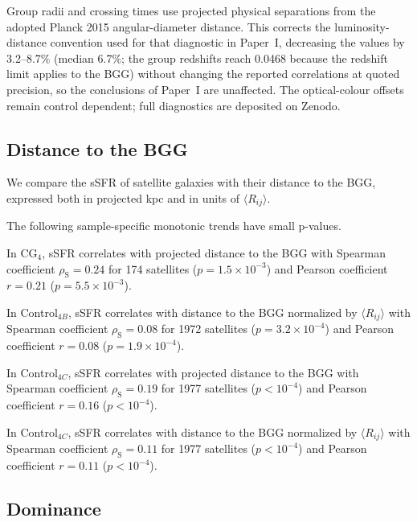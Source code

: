 \documentclass{aa}
\begin{document}
\begin{appendix}
Group radii and crossing times use projected physical separations from the adopted Planck 2015 angular-diameter distance. This corrects the luminosity-distance convention used for that diagnostic in Paper~I, decreasing the values by 3.2--8.7\% (median 6.7\%; the group redshifts reach 0.0468 because the redshift limit applies to the BGG) without changing the reported correlations at quoted precision, so the conclusions of Paper~I are unaffected. The optical-colour offsets remain control dependent; full diagnostics are deposited on Zenodo.

\iffalse
\subsection{Distance to the BGG}\label{app:dist2bgg}
We compare the sSFR of satellite galaxies with their distance to the BGG, expressed both in projected kpc and in units of $\langle R_{ij}\rangle$.

The following sample-specific monotonic trends have small p-values.

In CG$_4$, sSFR correlates with projected distance to the BGG with Spearman coefficient
$\rho_\mathrm{S} = 0.24$ for 174 satellites (\(p = 1.5\times 10^{-3}\)) and Pearson coefficient
$r = 0.21$ (\(p = 5.5\times 10^{-3}\)).

In Control$_{4B}$, sSFR correlates with distance to the BGG normalized by $\langle R_{ij}\rangle$ with Spearman coefficient
$\rho_\mathrm{S} = 0.08$ for 1972 satellites (\(p = 3.2\times 10^{-4}\)) and Pearson coefficient
$r = 0.08$ (\(p = 1.9\times 10^{-4}\)).

In Control$_{4C}$, sSFR correlates with projected distance to the BGG with Spearman coefficient
$\rho_\mathrm{S} = 0.19$ for 1977 satellites (\(p<10^{-4}\)) and Pearson coefficient
$r = 0.16$ (\(p<10^{-4}\)).

In Control$_{4C}$, sSFR correlates with distance to the BGG normalized by $\langle R_{ij}\rangle$ with Spearman coefficient
$\rho_\mathrm{S} = 0.11$ for 1977 satellites (\(p<10^{-4}\)) and Pearson coefficient
$r = 0.11$ (\(p<10^{-4}\)).



\subsection{Dominance}\label{app:dominance}










\end{appendix}
\end{document}
